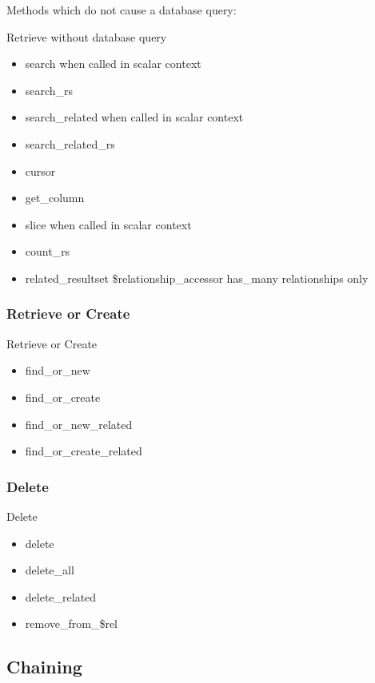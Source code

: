 Methods which do not cause a database query:

\begin{frame}{Retrieve without database query}
\begin{itemize}
\item search when called in scalar context
\item search\_rs
\item search\_related when called in scalar context
\item search\_related\_rs
\item cursor
\item get\_column
\item slice when called in scalar context
\item count\_rs
\item related\_resultset
\$relationship\_accessor has\_many relationships only
\end{itemize}
\end{frame}

\subsubsection{Retrieve or Create}

\begin{frame}{Retrieve or Create}
\begin{itemize}
\item find\_or\_new
\item find\_or\_create
\item find\_or\_new\_related 
\item find\_or\_create\_related
\end{itemize}
\end{frame}

\subsubsection{Delete}

\begin{frame}{Delete}
\begin{itemize}
\item delete
\item delete\_all
\item delete\_related
\item remove\_from\_\$rel
\end{itemize}
\end{frame}

\subsection{Chaining}

